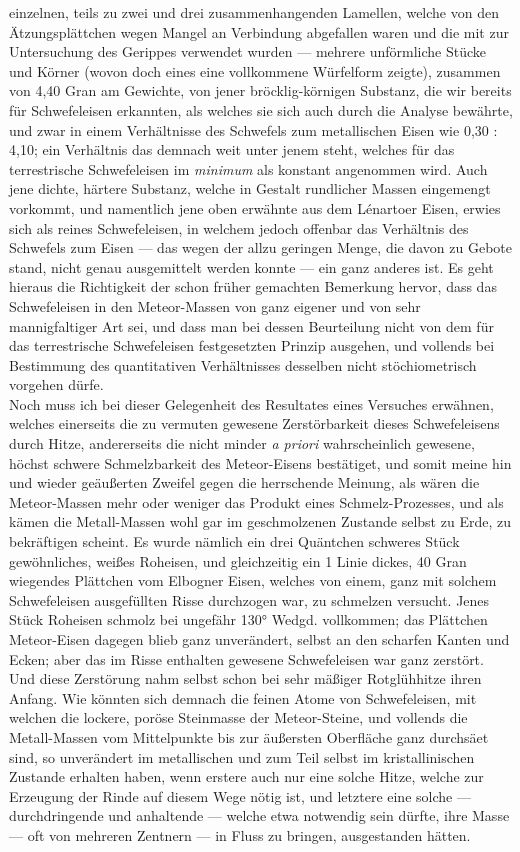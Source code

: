 \documentclass[a4paper, 11pt, oneside, german]{article}
\begin{document}
{einzelnen, teils zu zwei und drei zusammenhangenden Lamellen, welche von den Ätzungsplättchen wegen Mangel an Verbindung abgefallen waren und die mit zur Untersuchung des Gerippes verwendet wurden --- mehrere unförmliche Stücke und Körner (wovon doch eines eine vollkommene Würfelform zeigte), zusammen von 4,40 Gran am Gewichte, von jener bröcklig-körnigen Substanz, die wir bereits für Schwefeleisen erkannten, als welches sie sich auch durch die Analyse bewährte, und zwar in einem Verhältnisse des Schwefels zum metallischen Eisen wie 0,30 : 4,10; ein Verhältnis das demnach weit unter jenem steht, welches für das terrestrische Schwefeleisen im \emph{minimum} als konstant angenommen wird. Auch jene dichte, härtere Substanz, welche in Gestalt rundlicher Massen eingemengt vorkommt, und namentlich jene oben erwähnte aus dem Lénartoer Eisen, erwies sich als reines Schwefeleisen, in welchem jedoch offenbar das Verhältnis des Schwefels zum Eisen --- das wegen der allzu geringen Menge, die davon zu Gebote stand, nicht genau ausgemittelt werden konnte --- ein ganz anderes ist. Es geht hieraus die Richtigkeit der schon früher gemachten Bemerkung hervor, dass das Schwefeleisen in den Meteor-Massen von ganz eigener und von sehr mannigfaltiger Art sei, und dass man bei dessen Beurteilung nicht von dem für das terrestrische Schwefeleisen festgesetzten Prinzip ausgehen, und vollends bei Bestimmung des quantitativen Verhältnisses desselben nicht stöchiometrisch vorgehen dürfe.\\
Noch muss ich bei dieser Gelegenheit des Resultates eines Versuches erwähnen, welches einerseits die zu vermuten gewesene Zerstörbarkeit dieses Schwefeleisens durch Hitze, andererseits die nicht minder \emph{a priori} wahrscheinlich gewesene, höchst schwere Schmelzbarkeit des Meteor-Eisens bestätiget, und somit meine hin und wieder geäußerten Zweifel gegen die herrschende Meinung, als wären die Meteor-Massen mehr oder weniger das Produkt eines Schmelz-Prozesses, und als kämen die Metall-Massen wohl gar im geschmolzenen Zustande selbst zu Erde, zu bekräftigen scheint. Es wurde nämlich ein drei Quäntchen schweres Stück gewöhnliches, weißes Roheisen, und gleichzeitig ein 1 Linie dickes, 40 Gran wiegendes Plättchen vom Elbogner Eisen, welches von einem, ganz mit solchem Schwefeleisen ausgefüllten Risse durchzogen war, zu schmelzen versucht. Jenes Stück Roheisen schmolz bei ungefähr 130° Wedgd. vollkommen; das Plättchen Meteor-Eisen dagegen blieb ganz unverändert, selbst an den scharfen Kanten und Ecken; aber das im Risse enthalten gewesene Schwefeleisen war ganz zerstört. Und diese Zerstörung nahm selbst schon bei sehr mäßiger Rotglühhitze ihren Anfang. Wie könnten sich demnach die feinen Atome von Schwefeleisen, mit welchen die lockere, poröse Steinmasse der Meteor-Steine, und vollends die Metall-Massen vom Mittelpunkte bis zur äußersten Oberfläche ganz durchsäet sind, so unverändert im metallischen und zum Teil selbst im kristallinischen Zustande erhalten haben, wenn erstere auch nur eine solche Hitze, welche zur Erzeugung der Rinde auf diesem Wege nötig ist, und letztere eine solche --- durchdringende und anhaltende --- welche etwa notwendig sein dürfte, ihre Masse --- oft von mehreren Zentnern --- in Fluss zu bringen, ausgestanden hätten.}
\end{document}
